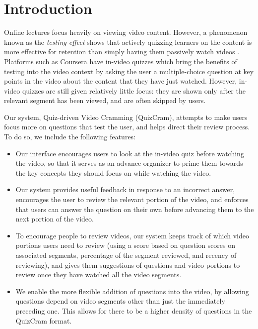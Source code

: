 \documentclass{sigchi}
\begin{document}


\section{Introduction}


Online lectures focus heavily on viewing video content. However, a phenomenon known as the \emph{testing effect} shows that actively quizzing learners on the content is more effective for retention than simply having them passively watch videos \cite{testingeffect}. Platforms such as Coursera have in-video quizzes which bring the benefits of testing into the video context by asking the user a multiple-choice question at key points in the video about the content that they have just watched. However, in-video quizzes are still given relatively little focus: they are shown only after the relevant segment has been viewed, and are often skipped by users.

Our system, Quiz-driven Video Cramming (QuizCram), attempts to make users focus more on questions that test the user, and helps direct their review process. To do so, we include the following features:

\begin{itemize}
\item Our interface encourages users to look at the in-video quiz before watching the video, so that it serves as an advance organizer to prime them towards the key concepts they should focus on while watching the video.
\item Our system provides useful feedback in response to an incorrect answer, encourages the user to review the relevant portion of the video, and enforces that users can answer the question on their own before advancing them to the next portion of the video.
\item To encourage people to review videos, our system keeps track of which video portions users need to review (using a score based on question scores on associated segments, percentage of the segment reviewed, and recency of reviewing), and gives them suggestions of questions and video portions to review once they have watched all the video segments.
\item We enable the more flexible addition of questions into the video, by allowing questions depend on video segments other than just the immediately preceding one. This allows for there to be a higher density of questions in the QuizCram format.
\end{itemize}
\end{document}
